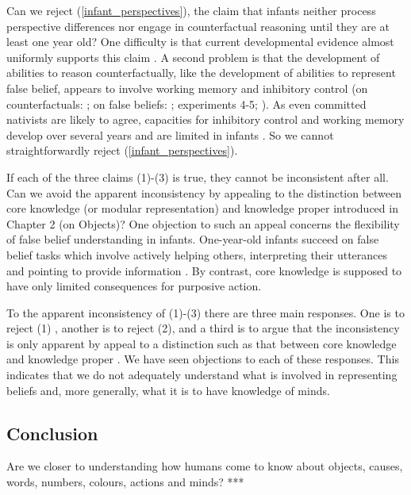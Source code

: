\documentclass[12pt,\papersize]{extarticle}
\begin{document}
Can we reject (\ref{infant_perspectives}), the claim that infants neither process perspective differences nor engage in counterfactual reasoning until they are at least one year old?
One difficulty is that current developmental evidence almost uniformly supports this claim  \citep{rafetseder:2010_counterfactual,beck:2011_almost}.
A second problem is that the development of abilities to reason counterfactually,
like the development of abilities to represent false belief,
appears to involve working memory and inhibitory control 
(on counterfactuals: 
	\citealp{drayton:2011_counterfactual,beck:2011_supporting};
on false beliefs: \citealp{apperly:2008_back, Apperly:2009cc}; \citealp{lin:2010_reflexively, McKinnon:2007rr} experiments 4-5; \citealp{saxe_reading_2006}).
As even committed nativists are likely to agree, capacities for inhibitory control and working memory develop over several years and are limited in infants \citep[e.g.][]{carlson:2005_developmentally}.
So we cannot straightforwardly reject (\ref{infant_perspectives}).



If each of the three claims (1)-(3) is true, they cannot be inconsistent after all. 
Can we avoid the apparent inconsistency by appealing to the distinction between core knowledge (or modular representation) and knowledge proper introduced in Chapter 2 (on Objects)?  
One objection to such an appeal concerns the flexibility of false belief understanding in infants.
One-year-old infants succeed on false belief tasks which involve actively helping others, interpreting their utterances and pointing to provide information \citep{Buttelmann:2009gy,Knudsen:2011fk,southgate:2010fb}. 
By contrast, core knowledge is supposed to have only limited consequences for purposive action.

To the apparent inconsistency of (1)-(3) there are three main responses.
One is to reject (1) \citep[e.g.][]{Perner:2005hq}, 
another is to reject (2),
 and a third is to argue that the inconsistency is only apparent by appeal to a distinction such as that between core knowledge and knowledge proper \citep[e.g.][]{Clements:1994cw,low:2010_preschoolers}.
We have seen objections to each of these responses.
This indicates that we do not adequately understand what is involved in representing beliefs and, more generally, what it is to have %
knowledge of minds.


\subsection{Conclusion}
Are we closer to understanding 
how humans come to know about %
objects,
causes,
words,
numbers,
colours,
actions
and
minds? 
***



\end{document}
